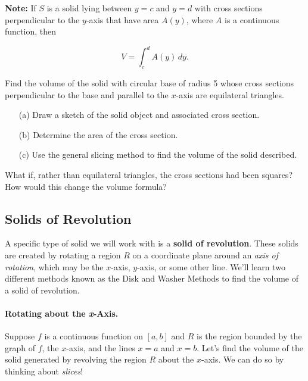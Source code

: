 \documentclass[12pt]{article}
\begin{document}
\vspace{5mm}

\textbf{Note:} If $S$ is a solid lying between $y=c$ and $y=d$ with cross sections perpendicular to the $y$-axis that have area $A(y)$, where $A$ is a continuous function, then 

$$V=\int_c^d A(y)\,dy.$$

\newpage

\Example Find the volume of the solid with circular base of radius 5 whose cross sections perpendicular to the base and parallel to the $x$-axis are equilateral triangles.

\begin{enumerate}
\item[(a)] Draw a sketch of the solid object and associated cross section.
\vspace{40mm}

\item[(b)] Determine the area of the cross section.

\vspace{70mm}

\item[(c)] Use the general slicing method to find the volume of the solid described.
\end{enumerate}

\newpage

\ExampleCont What if, rather than equilateral triangles, the cross sections had been squares? How would this change the volume formula?

\vspace{70mm}

\subsection*{Solids of Revolution}

A specific type of solid we will work with is a \textbf{solid of revolution}. These solids are created by rotating a region $R$ on a coordinate plane around an \textit{axis of rotation}, which may be the $x$-axis, $y$-axis, or some other line. We'll learn two different methods known as the Disk and Washer Methods to find the volume of a solid of revolution.

\paragraph{Rotating about the \textbf{\textit{x}}-Axis.} Suppose $f$ is a continuous function on $[a,b]$ and $R$ is the region bounded by the graph of $f$, the $x$-axis, and the lines $x=a$ and $x=b$. Let's find the volume of the solid generated by revolving the region $R$ about the $x$-axis. We can do so by thinking about \textit{slices}!
\end{document}
